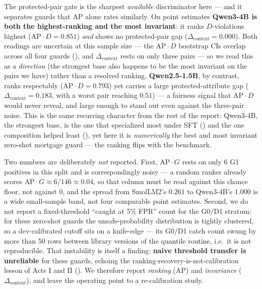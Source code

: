 The protected-pair gate is the sharpest \emph{available} discriminator here --- and it separates guards
that AP alone rates similarly. On point estimates \textbf{Qwen3-4B is both the highest-ranking and the most
invariant}: it ranks $D$-violations highest ($\text{AP}\cdot D = 0.851$) \emph{and} shows no protected-pair
gap ($\Delta_{\mathrm{context}} = 0.000$). Both readings are uncertain at this sample size --- the
$\text{AP}\cdot D$ bootstrap CIs overlap across all four guards (), and
$\Delta_{\mathrm{context}}$ rests on only three pairs --- so we read this as a \emph{direction} (the
strongest base also happens to be the most invariant on the pairs we have) rather than a resolved ranking.
\textbf{Qwen2.5-1.5B}, by contrast, ranks respectably ($\text{AP}\cdot D = 0.793$) yet carries a large
protected-attribute gap ($\Delta_{\mathrm{context}} = 0.183$, with a worst pair reaching $0.51$) --- a
fairness signal that $\text{AP}\cdot D$ would never reveal, and large enough to stand out even against the
three-pair noise. This is the same recurring character from the rest of the report:
Qwen3-4B, the strongest base, is the one that specialized most under SFT () and the one
composition helped least (), yet here it is \emph{numerically} the best and most invariant
zero-shot mortgage guard --- the ranking flips with the benchmark.

Two numbers are deliberately \emph{not} reported. First, $\text{AP}\cdot G$ rests on only 6 G1
positives in this split and is correspondingly noisy --- a random ranker already scores
$\text{AP}\cdot G\approx 6/146\approx0.04$, so that column must be read against this chance floor, not
against $0$, and the spread from SmolLM2's $0.261$ to Qwen3-4B's $1.000$ is a wide small-sample band, not
four comparable point estimates. Second, we do not report a fixed-threshold
``caught at 5\% FPR'' count for the G0/D1 stratum: for these zero-shot guards the unsafe-probability
distribution is tightly clustered, so a dev-calibrated cutoff sits on a knife-edge --- its G0/D1 catch
count swung by more than 50 rows between library versions of the quantile routine, i.e.\ it is not
reproducible. That instability is itself a finding: \textbf{naive threshold transfer is unreliable} for
these guards, echoing the ranking-recovery-is-not-calibration lesson of Acts I and II
(). We therefore report \emph{ranking} (AP) and \emph{invariance}
($\Delta_{\mathrm{context}}$), and leave the operating point to a re-calibration study.

